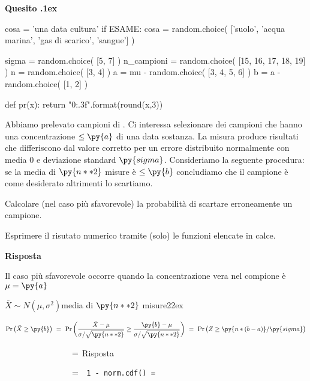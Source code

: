 \documentclass[11pt,twoside,a4paper]{article}
\def\Pr{{\rm Pr\,}}
\newcounter{quesito}
\newenvironment{question}{\addtocounter{quesito}{1}\bigskip\bigskip\par\textbf{Quesito \thequesito.\kern1ex}}{\vspace{\parskip}}
\newenvironment{answer}{\par\textbf{Risposta\quad}}{\vspace{\parskip}}
\begin{document}
\clearpage
\begin{question} %
\begin{pycode}
cosa = 'una data cultura'
if ESAME:
   cosa = random.choice( ['suolo', 'acqua marina', 'gas di scarico', 'sangue'] )
   
sigma = random.choice( [5, 7] )
n_campioni = random.choice( [15, 16, 17, 18, 19] )
n = random.choice( [3, 4] )
a = mu - random.choice( [3, 4, 5, 6] ) 
b = a - random.choice( [1, 2] )

def pr(x):
    return "{0:.3f}".format(round(x,3))
\end{pycode}
Abbiamo prelevato  campioni di . Ci interessa selezionare dei campioni che hanno una concentrazione $\le\py{a}$ di una data sostanza. La misura produce risultati che differiscono dal valore corretto per un errore distribuito normalmente con media $0$ e deviazione standard $\py{sigma}$. Consideriamo la seguente procedura: se la media di $\py{n**2}$ misure è $\le\py{b}$ concludiamo che il campione è come desiderato altrimenti lo scartiamo.

Calcolare (nel caso più sfavorevole) la probabilità di scartare erroneamente un campione.

Esprimere il risutato numerico tramite (solo) le funzioni elencate in calce.
\begin{answer}

Il caso più sfavorevole occorre quando la concentrazione vera nel compione è $\mu=\py{a}$ 


$\bar X\sim N(\mu,\sigma^2)$\hfill media di $\py{n**2}$ misure\kern22ex

$\Pr\big(\bar X\ge\py{b}\big)\ =\ \Pr\bigg(\dfrac{\bar X-\mu}{\sigma/\sqrt{\py{n**2}}}\ge\dfrac{\py{b}-\mu}{\sigma/\sqrt{\py{n**2}}}\bigg)\ =\  \Pr\big(Z\ge\py{n * (b-a) } /\py{sigma} \big)$

$\phantom{\Pr\big(\bar X\ge\py{b}\big)}\ =\ ${\hfill Risposta}

$\phantom{\Pr\big(\bar X\ge\py{b}\big)}\ =\ ${\tt\ 1 - norm.cdf()\ =\  }
\end{answer}
\end{question}
\end{document}

